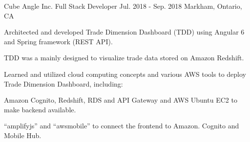 \begin{cventries}
  \cventry
    {Cube Angle Inc.} %
    {Full Stack Developer} %
    {Jul. 2018 - Sep. 2018} %
    {Markham, Ontario, CA} %
    {
      \begin{cvitems} %
        \item {Architected and developed Trade Dimension Dashboard (TDD) using Angular 6 and Spring framework (REST API).}
          \begin{cvsubitems}
            \item {TDD was a  mainly designed to visualize trade data stored on Amazon Redshift.}
          \end{cvsubitems}
        \item {Learned and utilized cloud computing concepts and various AWS tools to deploy Trade Dimension Dashboard, including:}
          \begin{cvsubitems}
            \item {Amazon Cognito, Redshift, RDS and API Gateway and AWS Ubuntu EC2 to make backend available.}
            \item {“amplifyjs” and “awsmobile” to connect the frontend to Amazon. Cognito and Mobile Hub.}
          \end{cvsubitems}
      \end{cvitems}
    }


\end{cventries}
